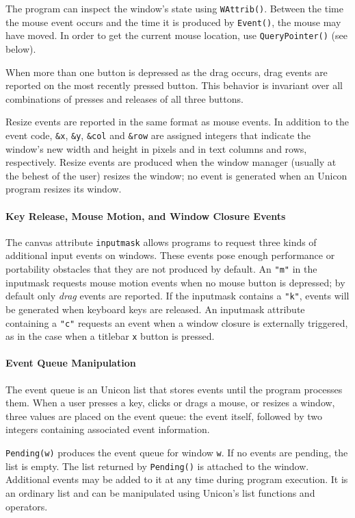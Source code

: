The program can inspect the window's state using
\texttt{WAttrib()}. Between the time the mouse event occurs and the
time it is produced by \texttt{Event()}, the mouse may have moved. In
order to get the current mouse location, use \texttt{QueryPointer()}
(see below).

When more than one button is depressed as the drag occurs, drag events
are reported on the most recently pressed button. This behavior is
invariant over all combinations of presses and releases of all three
buttons.

Resize events are reported in the same format as mouse events.  In
addition to the event code, \texttt{\&x}, \texttt{\&y}, \texttt{\&col}
and \texttt{\&row} are assigned integers that indicate the window's
new width and height in pixels and in text columns and rows,
respectively. Resize events are produced when the window manager
(usually at the behest of the user) resizes the window; no event is
generated when an Unicon program resizes its window.

\paragraph{Key Release, Mouse Motion, and Window Closure Events}
The canvas attribute \texttt{inputmask} allows programs to request
three kinds of additional input events on windows. These events pose
enough performance or portability obstacles that they are not produced
by default. An \texttt{"m"} in the inputmask requests mouse motion
events when no mouse button is depressed; by default only \emph{drag}
events are reported. If the inputmask contains a \texttt{"k"}, events
will be generated when keyboard keys are released. An inputmask
attribute containing a \texttt{"c"} requests an event when a window
closure is externally triggered, as in the case when a titlebar
\texttt{x} button is pressed.

\paragraph{Event Queue Manipulation}
The event queue is an Unicon list that stores events until the program
processes them. When a user presses a key, clicks or drags a mouse, or
resizes a window, three values are placed on the event queue: the
event itself, followed by two integers containing associated event
information.

\texttt{Pending(w)} produces the event queue for window \texttt{w}.
If no events are pending, the list is empty. The list returned by
\texttt{Pending()} is attached to the window. Additional events may be
added to it at any time during program execution.  It is an ordinary
list and can be manipulated using Unicon's list functions and
operators.

